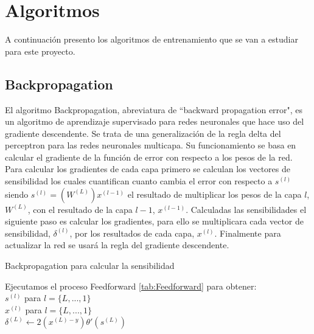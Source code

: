 \section{Algoritmos}

A continuación presento los algoritmos de entrenamiento que se van a estudiar para este proyecto.

\subsection{Backpropagation} \label{tab:Backprop}

El algoritmo Backpropagation, abreviatura de ``backward propagation error", es un algoritmo de aprendizaje supervisado para redes neuronales que hace uso del gradiente descendente. Se trata de una generalización de la regla delta del perceptron para las redes neuronales multicapa. Su funcionamiento se basa en calcular el gradiente de la función de error con respecto a los pesos de la red. Para calcular los gradientes de cada capa primero se calculan los vectores de sensibilidad los cuales cuantifican cuanto cambia el error con respecto a $s^{(l)}$ siendo $s^{(l)} = (W^{(L)})x^{(l-1)}$ el resultado de multiplicar los pesos de la capa $l$, $W^{(L)}$, con el resultado de la capa $l-1$, $x^{(l-1)}$. Calculadas las sensibilidades el siguiente paso es calcular los gradientes, para ello se multiplicara cada vector de sensibilidad, $\delta^{(l)}$, por los resultados de cada capa, $x^{(l)}$. Finalmente para actualizar la red se usará la regla del gradiente descendente.

\begin{algorithm}[H]
   \caption{Backpropagation para calcular la sensibilidad}
   Ejecutamos el proceso Feedforward \ref{tab:Feedforward} para obtener:\\
   $s^{(l)}$ para $l = \{L,...,1\}$ \\
   $x^{(l)}$ para $l = \{L,...,1\}$ \\  
   $\delta^{(L)} \gets 2(x^{(L)-y})\theta'(s^{(L)})$ \\
   
   \label{tab:Backprop_alg}
\end{algorithm}

